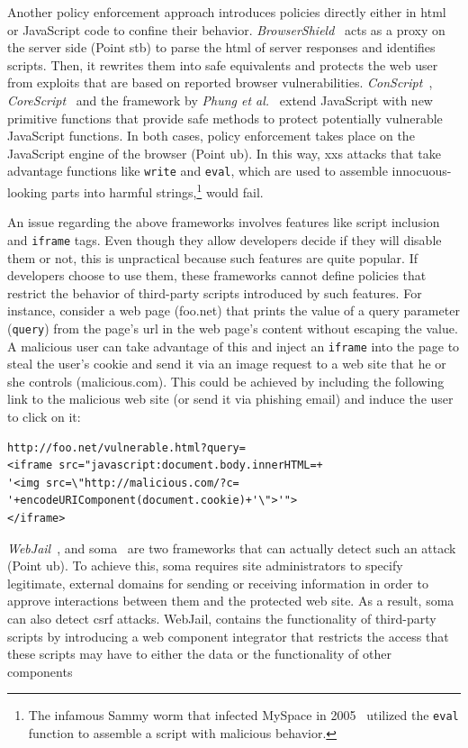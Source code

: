 \documentclass[conference]{IEEEtran}
\begin{document}
Another policy enforcement approach introduces
policies directly either in {\sc html} or JavaScript code
to confine their behavior. {\it BrowserShield}~\cite{RDWDE07}
acts as a proxy on the server side (Point {\sc s}t{\sc b}) to
parse the {\sc html} of server responses and identifies
scripts. Then, it rewrites them into safe equivalents
and protects the web user from exploits
that are based on reported browser vulnerabilities.
{\it ConScript}~\cite{ML10}, {\it CoreScript}~\cite{YCIS07}
and the framework by {\it Phung et al.}~\cite{PSC09}
extend JavaScript with new primitive functions that
provide safe methods to protect potentially vulnerable
JavaScript functions. In both cases, policy enforcement takes
place on the JavaScript engine of the browser (Point {\sc ub}).
In this way, {\sc xxs} attacks that take advantage
functions like {\tt write} and {\tt eval}, which are
used to assemble innocuous-looking parts into harmful
strings,\footnote{The infamous Sammy worm that
infected MySpace in 2005~\cite{SP07,ELX07}
utilized the {\tt eval} function to assemble a
script with malicious behavior.} would fail.

An issue regarding the above frameworks
involves features like script inclusion
and {\tt iframe} tags. Even though they allow developers
decide if they will disable them or not,
this is unpractical because such features are quite popular.
If developers choose to use them, these frameworks cannot
define policies that restrict the behavior of third-party
scripts introduced by such features. For instance,
consider a web page (foo.net) that prints the value
of a query parameter ({\tt query}) from the
page's {\sc url} in the web page's content
without escaping the value. A malicious user
can take advantage of this and inject an {\tt iframe}
into the page to steal the user's cookie and
send it via an image request to a web site
that he or she controls (malicious.com).
This could be achieved by including the following
link to the malicious web site (or send it via phishing
email) and induce the user to click on it:

\lstset{language=VBScript, basicstyle=\footnotesize\ttfamily,}
\begin{lstlisting}
http://foo.net/vulnerable.html?query=
<iframe src="javascript:document.body.innerHTML=+
'<img src=\"http://malicious.com/?c=
'+encodeURIComponent(document.cookie)+'\">'">
</iframe>
\end{lstlisting}

\noindent
{\it WebJail}~\cite{VDDPJ11}, and
{\sc soma}~\cite{OWVS08} are two frameworks that
can actually detect such an attack (Point {\sc ub}).
To achieve this, {\sc soma} requires site administrators
to specify legitimate, external domains for sending
or receiving information in order to approve interactions
between them and the protected web site. As a result,
{\sc soma} can also detect {\sc csrf} attacks.
WebJail, contains the functionality of
third-party scripts by introducing a web component
integrator that restricts the access that these scripts
may have to either the data or the functionality of other components
\end{document}
